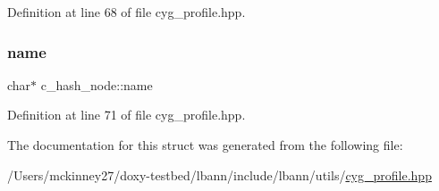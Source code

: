 Definition at line 68 of file cyg\+\_\+profile.\+hpp.

\mbox{\label{structc__hash__node_adb4fc5dcf1d4a4e4b4b79db0bc40046f}} 
\subsubsection{\texorpdfstring{name}{name}}
{\footnotesize\ttfamily char$\ast$ c\+\_\+hash\+\_\+node\+::name}



Definition at line 71 of file cyg\+\_\+profile.\+hpp.



The documentation for this struct was generated from the following file\+:\begin{DoxyCompactItemize}
\item 
/\+Users/mckinney27/doxy-\/testbed/lbann/include/lbann/utils/\hyperlink{cyg__profile_8hpp}{cyg\+\_\+profile.\+hpp}\end{DoxyCompactItemize}
